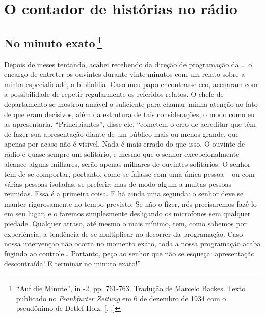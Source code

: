 


\part{O contador de histórias no rádio}

\chapter{No minuto exato\,\footnote[*]{``Auf die Minute'', in  -2, pp. 761-763.
  Tradução de Marcelo Backes. Texto publicado no \emph{Frankfurter
  Zeitung} em 6 de dezembro de 1934 com o pseudônimo de Detlef Holz.
  [. .]} }

Depois de meses tentando, acabei recebendo da direção de programação da
\ldots{} o encargo de entreter os ouvintes durante vinte minutos com um
relato sobre a minha especialidade, a bibliofilia. Caso meu papo
encontrasse eco, acenaram com a possibilidade de repetir regularmente os
referidos relatos. O chefe de departamento se mostrou amável o
suficiente para chamar minha atenção ao fato de que eram decisivos, além
da estrutura de tais considerações, o modo como eu as apresentaria.
``Principiantes'', disse ele, ``cometem o erro de acreditar que têm de
fazer sua apresentação diante de um público mais ou menos grande, que
apenas por acaso não é visível. Nada é mais errado do que isso. O
ouvinte de rádio é quase sempre um solitário, e mesmo que o senhor
excepcionalmente alcance alguns milhares, serão apenas milhares de
ouvintes solitários. O senhor tem de se comportar, portanto, como se
falasse com uma única pessoa -- ou com várias pessoas isoladas, se
preferir; mas de modo algum a muitas pessoas reunidas. Essa é a primeira
coisa. E há ainda uma segunda: o senhor deve se manter rigorosamente no
tempo previsto. Se não o fizer, nós precisaremos fazê-lo em seu lugar, e
o faremos simplesmente desligando os microfones sem qualquer piedade.
Qualquer atraso, até mesmo o mais mínimo, tem, como sabemos por
experiência, a tendência de se multiplicar no decorrer da programação.
Caso nossa intervenção não ocorra no momento exato, toda a nossa
programação acaba fugindo ao controle\ldots{} Portanto, peço ao senhor que
não se esqueça: apresentação descontraída! E terminar no minuto exato!''

